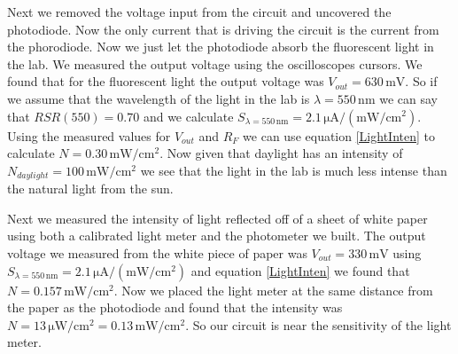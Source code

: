 \documentclass[11pt]{article}
\numberwithin{equation}{section}
\numberwithin{figure}{section}
\numberwithin{table}{section}
\newcommand{\unit}[1]{\ensuremath{\, \mathrm{#1}}}
\begin{document}
Next we removed the voltage input from the circuit and uncovered the photodiode. Now the only current that is driving the circuit is the current from the phorodiode. Now we just let the photodiode absorb the fluorescent light in the lab. We measured the output voltage using the oscilloscopes cursors. We found that for the fluorescent light the output voltage was $V_{out} = 630\unit{mV}$. So if we assume that the wavelength of the light in the lab is $\lambda = 550\unit{nm}$ we can say that $RSR(550) = 0.70$ and we calculate $S_{\lambda=550\unit{nm}} = 2.1\unit{\mu A/(mW/cm^2)}$. Using the measured values for $V_{out}$ and $R_F$ we can use equation \ref{LightInten} to calculate $N = 0.30\unit{mW/cm^2}$. Now given that daylight has an intensity of $N_{daylight} = 100\unit{mW/cm^2}$ we see that the light in the lab is much less intense than the natural light from the sun. 

Next we measured the intensity of light reflected off of a sheet of white paper using both a calibrated light meter and the photometer we built. The output voltage we measured from the white piece of paper was $V_{out} = 330\unit{mV}$ using $S_{\lambda=550\unit{nm}}=2.1\unit{\mu A/(mW/cm^2)}$ and equation \ref{LightInten} we found that $N = 0.157\unit{mW/cm^2}$. Now we placed the light meter at the same distance from the paper as the photodiode and found that the intensity was $N = 13\unit{\mu W/cm^2} = 0.13\unit{mW/cm^2}$. So our circuit is near the sensitivity of the light meter.
\end{document}
